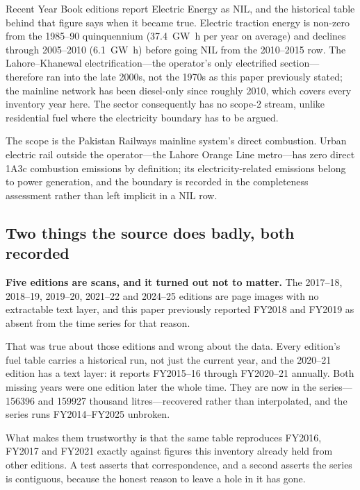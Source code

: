 Recent Year Book editions report Electric Energy as NIL, and the historical table behind that
figure says when it became true. Electric traction energy is non-zero from the 1985--90
quinquennium (\SI{37.4}{\giga\watt\hour} per year on average) and declines through 2005--2010
(\SI{6.1}{\giga\watt\hour}) before going NIL from the 2010--2015 row. The Lahore--Khanewal
electrification---the operator's only electrified section---therefore ran into the late
2000s, not the 1970s as this paper previously stated; the mainline network has been
diesel-only since roughly 2010, which covers every inventory year here. The sector
consequently has no scope-2 stream, unlike residential fuel where the electricity boundary has
to be argued.

The scope is the Pakistan Railways mainline system's direct combustion. Urban electric rail
outside the operator---the Lahore Orange Line metro---has zero direct 1A3c combustion
emissions by definition; its electricity-related emissions belong to power generation, and the
boundary is recorded in the completeness assessment rather than left implicit in a NIL row.

\subsection{Two things the source does badly, both recorded}

\textbf{Five editions are scans, and it turned out not to matter.} The 2017--18, 2018--19,
2019--20, 2021--22 and 2024--25 editions are page images with no extractable text layer, and
this paper previously reported FY2018 and FY2019 as absent from the time series for that
reason.

That was true about those editions and wrong about the data. Every edition's fuel table carries
a historical run, not just the current year, and the 2020--21 edition has a text layer: it
reports FY2015--16 through FY2020--21 annually. Both missing years were one edition later the
whole time. They are now in the series---\num{156396} and \num{159927} thousand
litres---recovered rather than interpolated, and the series runs FY2014--FY2025 unbroken.

What makes them trustworthy is that the same table reproduces FY2016, FY2017 and FY2021
exactly against figures this inventory already held from other editions. A test asserts that
correspondence, and a second asserts the series is contiguous, because the honest reason to
leave a hole in it has gone.

